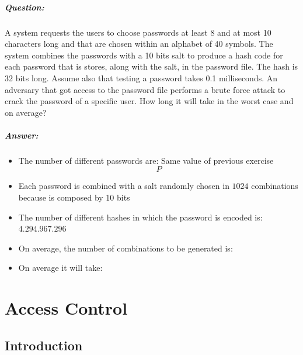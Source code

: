 \documentclass{article}
\begin{document}
\begin{enumerate}
        \subparagraph{Question: }     
                    A system requests the users to choose passwords at least 8 and at most 10 characters long and that are
                    chosen within an alphabet of 40 symbols. The system combines the passwords with a 10 bits salt to
                    produce a hash code for each password that is stores, along with the salt, in the password file. The hash
                    is 32 bits long.
                    Assume also that testing a password takes 0.1 milliseconds.
                    An adversary that got access to the password file performs a brute force attack to crack the password of
                    a specific user. How long it will take in the worst case and on average?
        \subparagraph{Answer: }
                
                    \begin{itemize}
                        \item The number of different passwords are: Same value of previous exercise \[P\]
                        \item Each password is combined with a salt randomly chosen in \(1024\) combinations because is composed by 10 bits
                        \item The number of different hashes in which the password is encoded is: \(4.294.967.296\)
                        \item On average, the number of combinations to be generated is:
                        \item On average it will take: 
                    \end{itemize}
                
                
            \end{enumerate}

\section{Access Control}
            \subsection{Introduction}
\end{document}
